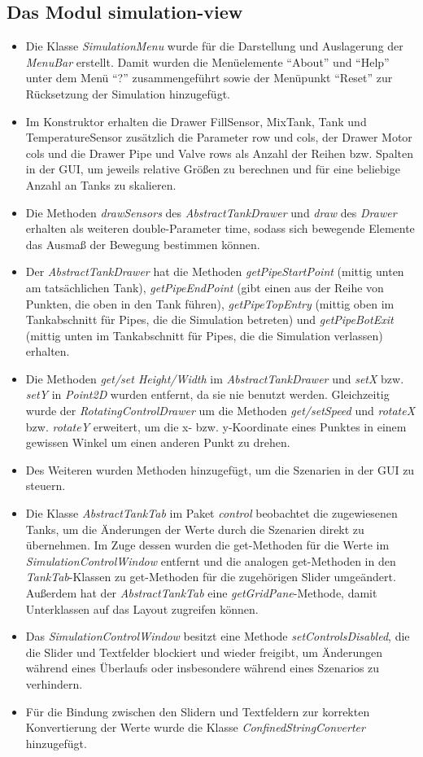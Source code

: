 \documentclass[parskip=full]{scrartcl}
\begin{document}
\subsection{Das Modul simulation-view}
\begin{itemize}
 \item Die Klasse \emph{SimulationMenu} wurde für die Darstellung und Auslagerung der \emph{MenuBar} erstellt. Damit wurden die Menüelemente "`About"' und "`Help"' unter dem Menü "`?"' zusammengeführt sowie der Menüpunkt "`Reset"' zur Rücksetzung der Simulation hinzugefügt.
 \item Im Konstruktor erhalten die Drawer FillSensor, MixTank, Tank und TemperatureSensor zusätzlich die Parameter row und cols, der Drawer Motor cols und die Drawer Pipe und Valve rows als Anzahl der Reihen bzw. Spalten in der GUI, um jeweils relative Größen zu berechnen und für eine beliebige Anzahl an Tanks zu skalieren.
 \item Die Methoden \emph{drawSensors} des \emph{AbstractTankDrawer} und \emph{draw} des \emph{Drawer} erhalten als weiteren double-Parameter time, sodass sich bewegende Elemente das Ausmaß der Bewegung bestimmen können.
 \item Der \emph{AbstractTankDrawer} hat die Methoden \emph{getPipeStartPoint} (mittig unten am tatsächlichen Tank), \emph{getPipeEndPoint} (gibt einen aus der Reihe von Punkten, die oben in den Tank führen), \emph{getPipeTopEntry} (mittig oben im Tankabschnitt für Pipes, die die Simulation betreten) und \emph{getPipeBotExit} (mittig unten im Tankabschnitt für Pipes, die die Simulation verlassen) erhalten.
 \item Die Methoden \emph{get/set Height/Width} im \emph{AbstractTankDrawer} und \emph{setX} bzw. \emph{setY} in \emph{Point2D} wurden entfernt, da sie nie benutzt werden. Gleichzeitig wurde der \emph{RotatingControlDrawer} um die Methoden \emph{get/setSpeed} und \emph{rotateX} bzw. \emph{rotateY} erweitert, um die x- bzw. y-Koordinate eines Punktes in einem gewissen Winkel um einen anderen Punkt zu drehen.
 \item Des Weiteren wurden Methoden hinzugefügt, um die Szenarien in der GUI zu steuern.
 \item Die Klasse \emph{AbstractTankTab} im Paket \emph{control} beobachtet die zugewiesenen Tanks, um die Änderungen der Werte durch die Szenarien direkt zu übernehmen. Im Zuge dessen wurden die get-Methoden für die Werte im \emph{SimulationControlWindow} entfernt und die analogen get-Methoden in den \emph{TankTab}-Klassen zu get-Methoden für die zugehörigen Slider umgeändert. Außerdem hat der \emph{AbstractTankTab} eine \emph{getGridPane}-Methode, damit Unterklassen auf das Layout zugreifen können.
 \item Das \emph{SimulationControlWindow} besitzt eine Methode \emph{setControlsDisabled}, die die Slider und Textfelder blockiert und wieder freigibt, um Änderungen während eines Überlaufs oder insbesondere während eines Szenarios zu verhindern.
 \item Für die Bindung zwischen den Slidern und Textfeldern zur korrekten Konvertierung der Werte wurde die Klasse \emph{ConfinedStringConverter} hinzugefügt.
\end{itemize}
\end{document}
